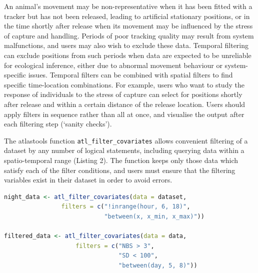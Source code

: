 \documentclass[10pt,paper=a4,headings=standardclasses
]{scrartcl}
\begin{document}
An animal’s movement may be non-representative when it has been fitted with a tracker but has not been released, leading to artificial stationary positions, or in the time shortly after release when its movement may be influenced by the stress of capture and handling.
Periods of poor tracking quality may result from system malfunctions, and users may also wish to exclude these data.
Temporal filtering can exclude positions from such periods when data are expected to be unreliable for ecological inference, either due to abnormal movement behaviour or system-specific issues.  
Temporal filters can be combined with spatial filters to find specific time-location combinations. 
For example, users who want to study the response of individuals to the stress of capture can select for positions shortly after release and within a certain distance of the release location.
Users should apply filters in sequence rather than all at once, and visualise the output after each filtering step (`sanity checks').

The atlastools function \texttt{atl\_filter\_covariates} allows convenient filtering of a dataset by any number of logical statements, including querying data within a spatio-temporal range (Listing 2).
The function keeps only those data which satisfy each of the filter conditions, and users must ensure that the filtering variables exist in their dataset in order to avoid errors.

\begin{lstlisting}[float, language=R, style=customR, caption = {
    Data can be filtered by a temporal or a spatio-temporal range using \texttt{atl\_filter\_covariates}. 
    Filter conditions are passed to the \texttt{filters} argument as a character vector. 
    Only rows in the data satisfying \textit{all} the conditions are retained. 
    Here, the first example shows how nighttime data can be retained using a predicate that determines whether the value of `hour' is between 6 and 18, and also within a range of X coordinates.
    The second example retains ATLAS locations calculated using $>$ 3 base stations (\texttt{NBS}), with location error (\texttt{SD}) $<$ 100, and data between an arbitrary day 5 and day 8.
    }]
night_data <- atl_filter_covariates(data = dataset,
                filters = c("!inrange(hour, 6, 18)",
                            "between(x, x_min, x_max)"))

filtered_data <- atl_filter_covariates(data = data,
                    filters = c("NBS > 3",
                                "SD < 100",
                                "between(day, 5, 8)"))                            
\end{lstlisting}
\end{document}
